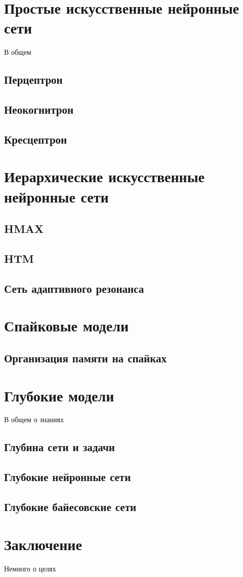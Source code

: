 \documentclass[11pt]{memoir}
\begin{document}
	
	\chapter{Простые искусственные нейронные сети}
	В общем
	
	\section{Перцептрон}
	
	\section{Неокогнитрон}
	
	\section{Кресцептрон}
	
	\chapter{Иерархические искусственные нейронные сети}
		
	\section{HMAX}
	
	\section{HTM}

	\section{Сеть адаптивного резонанса}
	
	\chapter{Спайковые модели}
	
	\section{Организация памяти на спайках}
	
	
	\chapter{Глубокие модели}
	В общем о знаниях
	
	\section{Глубина сети и задачи}
	\section{Глубокие нейронные сети}
	\section{Глубокие байесовские сети}

	
	
	\chapter*{Заключение}
	Немного о целях
	\printbibliography
\end{document}
